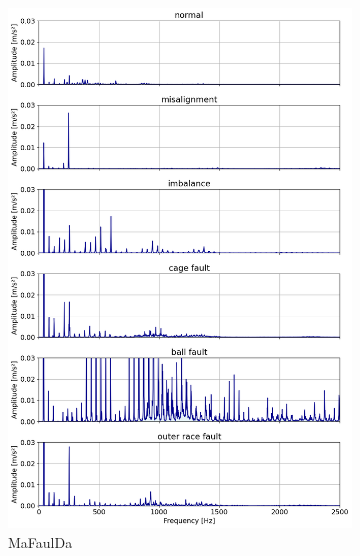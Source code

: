 \documentclass{llncs}
\begin{document}
\begin{figure}
     \begin{subfigure}[b]{0.3\textwidth}
         \centering
         \includegraphics[width=\textwidth]{fig/spectrum/mafaulda-wideband.png}
         \caption{MaFaulDa}
         \label{fig:mafaulda-wideband}
     \end{subfigure}
     \hfill
     \begin{subfigure}[b]{0.3\textwidth}
         \centering

\end{subfigure}
\end{figure}
\end{document}

